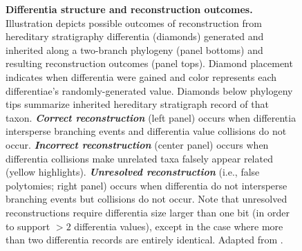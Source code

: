 \begin{figure}
\begin{minipage}{0.5\textwidth}
\begin{minipage}{0.3\linewidth}
\vspace{0.25ex}
\label{fig:hstrat-failure-modes:unresolved}
\end{minipage}
\end{minipage}%
  \begin{minipage}{0.5\textwidth}
  \caption{%
    \textbf{Differentia structure and reconstruction outcomes.}
    \footnotesize
    Illustration depicts possible outcomes of reconstruction from hereditary stratigraphy differentia (diamonds) generated and inherited along a two-branch phylogeny (panel bottoms) and resulting reconstruction outcomes (panel tops).
    Diamond placement indicates when differentia were gained and color represents each differentiae's randomly-generated value.
    Diamonds below phylogeny tips summarize inherited hereditary stratigraph record of that taxon.
    \textbf{\textit{Correct reconstruction}} (left panel) occurs when differentia intersperse branching events and differentia value collisions do not occur.
    \textbf{\textit{Incorrect reconstruction}} (center panel) occurs when differentia collisions make unrelated taxa falsely appear related (yellow highlights).
    \textbf{\textit{Unresolved reconstruction}} (i.e., false polytomies; right panel) occurs when differentia do not intersperse branching events but collisions do not occur.
    Note that unresolved reconstructions require differentia size larger than one bit (in order to support $>2$ differentia values), except in the case where more than two differentia records are entirely identical.
    Adapted from \citep{moreno2025testing}.
  }
  \label{fig:hstrat-failure-modes}
  \end{minipage}
\end{figure}
